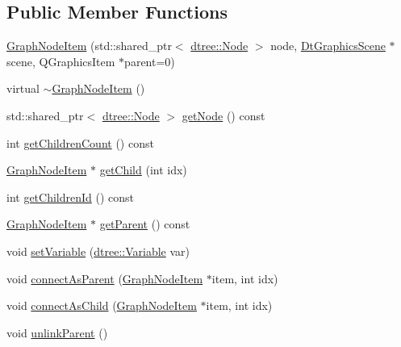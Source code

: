 \subsection*{Public Member Functions}
\begin{DoxyCompactItemize}
\item 
\mbox{\hyperlink{class_graph_node_item_a42bb99a91d988fa1e2e45f051278d4ee}{Graph\+Node\+Item}} (std\+::shared\+\_\+ptr$<$ \mbox{\hyperlink{classdtree_1_1_node}{dtree\+::\+Node}} $>$ node, \mbox{\hyperlink{class_dt_graphics_scene}{Dt\+Graphics\+Scene}} $\ast$scene, Q\+Graphics\+Item $\ast$parent=0)
\item 
virtual \mbox{\hyperlink{class_graph_node_item_a1fcb3b9e912eb131382ccda545ce1006}{$\sim$\+Graph\+Node\+Item}} ()
\item 
std\+::shared\+\_\+ptr$<$ \mbox{\hyperlink{classdtree_1_1_node}{dtree\+::\+Node}} $>$ \mbox{\hyperlink{class_graph_node_item_aabb9309e7f6e14470c786af0e18e0501}{get\+Node}} () const
\item 
int \mbox{\hyperlink{class_graph_node_item_a44fe4ca165743ce627359ae826e6d18e}{get\+Children\+Count}} () const
\item 
\mbox{\hyperlink{class_graph_node_item}{Graph\+Node\+Item}} $\ast$ \mbox{\hyperlink{class_graph_node_item_a099242a198b636b3f63e67045aa4bb91}{get\+Child}} (int idx)
\item 
int \mbox{\hyperlink{class_graph_node_item_ac3740a64b8663d7cf84188fd6bd714f7}{get\+Children\+Id}} () const
\item 
\mbox{\hyperlink{class_graph_node_item}{Graph\+Node\+Item}} $\ast$ \mbox{\hyperlink{class_graph_node_item_a15314894ebc8514804988745006a6384}{get\+Parent}} () const
\item 
void \mbox{\hyperlink{class_graph_node_item_ab88f062303036ac1029489dfe8adebe8}{set\+Variable}} (\mbox{\hyperlink{namespacedtree_a79fe30831a14df904319f9e783b3189b}{dtree\+::\+Variable}} var)
\item 
void \mbox{\hyperlink{class_graph_node_item_ad0cbf9d18e5007b89655412fb1baf14d}{connect\+As\+Parent}} (\mbox{\hyperlink{class_graph_node_item}{Graph\+Node\+Item}} $\ast$item, int idx)
\item 
void \mbox{\hyperlink{class_graph_node_item_a328fab10f885d7e05e0467598f584d7f}{connect\+As\+Child}} (\mbox{\hyperlink{class_graph_node_item}{Graph\+Node\+Item}} $\ast$item, int idx)
\item 
void \mbox{\hyperlink{class_graph_node_item_ac873766a72d3e5f0081d3f5db5e21943}{unlink\+Parent}} ()
\item 

\end{DoxyCompactItemize}
